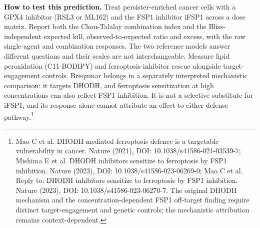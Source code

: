 \documentclass[11pt,twoside,openright]{report}
\begin{document}
\textbf{How to test this prediction.} Treat persister-enriched cancer cells with a GPX4 inhibitor (RSL3 or ML162) and the FSP1 inhibitor iFSP1 across a dose matrix. Report both the Chou-Talalay combination index and the Bliss-independent expected kill, observed-to-expected ratio and excess, with the raw single-agent and combination responses. The two reference models answer different questions and their scales are not interchangeable. Measure lipid peroxidation (C11-BODIPY) and ferroptosis-inhibitor rescue alongside target-engagement controls. Brequinar belongs in a separately interpreted mechanistic comparison: it targets DHODH, and ferroptosis sensitization at high concentrations can also reflect FSP1 inhibition. It is not a selective substitute for iFSP1, and its response alone cannot attribute an effect to either defense pathway.\footnote{Mao C et al. DHODH-mediated ferroptosis defence is a targetable vulnerability in cancer. Nature (2021), DOI: 10.1038/s41586-021-03539-7; Mishima E et al. DHODH inhibitors sensitize to ferroptosis by FSP1 inhibition. Nature (2023), DOI: 10.1038/s41586-023-06269-0; Mao C et al. Reply to: DHODH inhibitors sensitize to ferroptosis by FSP1 inhibition. Nature (2023), DOI: 10.1038/s41586-023-06270-7. The original DHODH mechanism and the concentration-dependent FSP1 off-target finding require distinct target-engagement and genetic controls; the mechanistic attribution remains context-dependent.}
\end{document}
